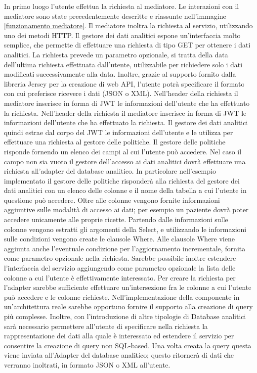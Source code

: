 \documentclass[12pt]{report}
\begin{document}
In primo luogo l'utente effettua la richiesta al mediatore. 
Le interazioni con il mediatore sono state precedentemente descritte e riassunte nell'immagine \ref{funzionamento mediatore}.
Il mediatore inoltra la richiesta al servizio, utilizzando uno dei metodi HTTP.
Il gestore dei dati analitici espone un'interfaccia molto semplice, che permette di effettuare una richiesta di tipo GET per ottenere i dati analitici.
La richiesta prevede un parametro opzionale, si tratta della data dell'ultima richiesta effettuata dall'utente, utilizzabile per richiedere solo i dati modificati successivamente alla data.
Inoltre, grazie al supporto fornito dalla libreria Jersey per la creazione di web API, l'utente potrà specificare il formato con cui preferisce ricevere i dati (JSON o XML).
Nell'header della richiesta il mediatore inserisce in forma di JWT le informazioni dell'utente che ha effettuato la richiesta.
Nell'header della richiesta il mediatore inserisce in forma di JWT le informazioni dell'utente che ha effettuato la richiesta.
Il gestore dei dati analitici quindi estrae dal corpo del JWT le informazioni dell'utente e le utilizza per effettuare una richiesta al gestore delle politiche.
Il gestore delle politiche risponde fornendo un elenco dei campi al cui l'utente può accedere.
Nel caso il campo non sia vuoto il gestore dell'accesso ai dati analitici dovrà effettuare una richiesta all'adapter del database analitico.
In particolare nell'esempio implementato il gestore delle politiche risponderà alla richiesta del gestore dei dati analitici con un elenco delle colonne e il nome della tabella a cui l'utente in questione può accedere.
Oltre alle colonne vengono fornite informazioni aggiuntive sulle modalità di accesso ai dati; per esempio un paziente dovrà poter accedere unicamente alle proprie ricette.
Partendo dalle informazioni sulle colonne vengono estratti gli argomenti della Select, e utilizzando le informazioni sulle condizioni vengono create le clausole Where.
Alle clausole Where viene aggiunta anche l'eventuale condizione per l'aggiornamento incrementale, fornita come parametro opzionale nella richiesta.
Sarebbe possibile inoltre estendere l'interfaccia del servizio aggiungendo come parametro opzionale la lista delle colonne a cui l'utente è effettivamente interessato.
Per creare la richiesta per l'adapter sarebbe sufficiente effettuare un'intersezione fra le colonne a cui l'utente può accedere e le colonne richieste.
Nell'implementazione della componente in un'architettura reale sarebbe opportuno fornire il supporto alla creazione di query più complesse.
Inoltre, con l'introduzione di altre tipologie di Database analitici sarà necessario permettere all'utente di specificare nella richiesta la rappresentazione dei dati alla quale è interessato ed estendere il servizio per consentire la creazione di query non SQL-based. 
Una volta creata la query questa viene inviata all'Adapter del database analitico; questo ritornerà di dati che verranno inoltrati, in formato JSON o XML all'utente.
\end{document}
